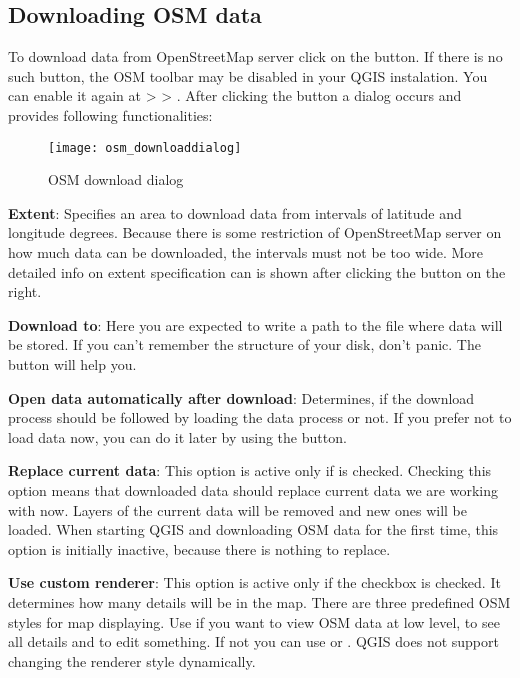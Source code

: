 \subsection{Downloading OSM data}  

To download data from OpenStreetMap server click on the 
 button. If there is no 
such button, the OSM toolbar may be disabled in your QGIS instalation.
You can enable it again at  > 
 > . After clicking the 
button a dialog occurs and provides following functionalities:

\begin{figure}[ht]
   \begin{center}
   \caption{OSM download dialog \nixcaption}\label{fig:osmdownload}\smallskip
   \texttt{[image: osm\_downloaddialog]}
\end{center}
\end{figure}

\begin{description}
\item \textbf{Extent}: Specifies an area to download data from intervals 
of latitude and longitude degrees. Because there is some restriction of 
OpenStreetMap server on how much data can be downloaded, the intervals 
must not be too wide. More detailed info on extent specification can is 
shown after clicking the  button on 
the right.
\item \textbf{Download to}: Here you are expected to write a path to the 
file where data will be stored. If you can't remember the structure of 
your disk, don't panic. The  button will help you.
\item \textbf{Open data automatically after download}: Determines, if the 
download process should be followed by loading the data process or not. If you 
prefer not to load data now, you can do it later by using 
the  button.
\item \textbf{Replace current data}: This option is active only if 
 is checked. 
Checking this option means that downloaded data should replace
current data we are working with now. Layers of the current data will be 
removed and new ones will be loaded. When starting QGIS and downloading 
OSM data for the first time, this option is initially inactive, because 
there is nothing to replace.
\item \textbf{Use custom renderer}: This option is active only if the 
 checkbox is checked. 
It determines how many details will be in the map. There are three predefined 
OSM styles for map displaying. Use  if you want to view 
OSM data at low level, to see all details and to edit something. If not you 
can use  or . QGIS \CURRENT does 
not support changing the renderer style dynamically.
\end{description}

